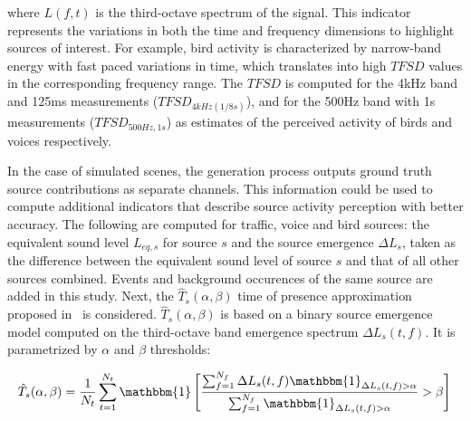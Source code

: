 \documentclass[twocolumn]{article}
\begin{document}
where $L(f, t)$ is the third-octave spectrum of the signal. This indicator represents the variations in both the time and frequency dimensions to highlight sources of interest. For example, bird activity is characterized by narrow-band energy with fast paced variations in time, which translates into high $TFSD$ values in the corresponding frequency range. The $TFSD$ is computed for the 4kHz band and 125ms measurements ($TFSD_{4kHz(1/8s)}$), and for the 500Hz band with 1s measurements ($TFSD_{500Hz, 1s}$) as estimates of the perceived activity of birds and voices respectively.

In the case of simulated scenes, the generation process outputs ground truth source contributions as separate channels. This information could be used to compute additional indicators that describe source activity perception with better accuracy. The following are computed for traffic, voice and bird sources: the equivalent sound level $L_{eq, s}$ for source $s$ and the source emergence $\Delta L_{s}$, taken as the difference between the equivalent sound level of source $s$ and that of all other sources combined. Events and background occurences of the same source are added in this study. Next, the $\hat T_s(\alpha, \beta)$ time of presence approximation proposed in~\cite{gontier2018} is considered. $\hat T_s(\alpha, \beta)$ is based on a binary source emergence model computed on the third-octave band emergence spectrum $\Delta L_{s}(t, f)$. It is parametrized by $\alpha$ and $\beta$ thresholds:

\begin{equation}\label{eq:ts}
\hat T_s(\alpha, \beta) = \frac{1}{N_t}\sum_{t = 1}^{N_t}\mathbbm{1}\left[ \frac{\sum_{f = 1}^{N_f}\Delta L_{s}(t, f)\mathbbm{1}_{\Delta L_{s}(t, f)>\alpha}}{\sum_{f = 1}^{N_f}\mathbbm{1}_{\Delta L_{s}(t, f)>\alpha}}>\beta \right]\\
\end{equation}
\end{document}
